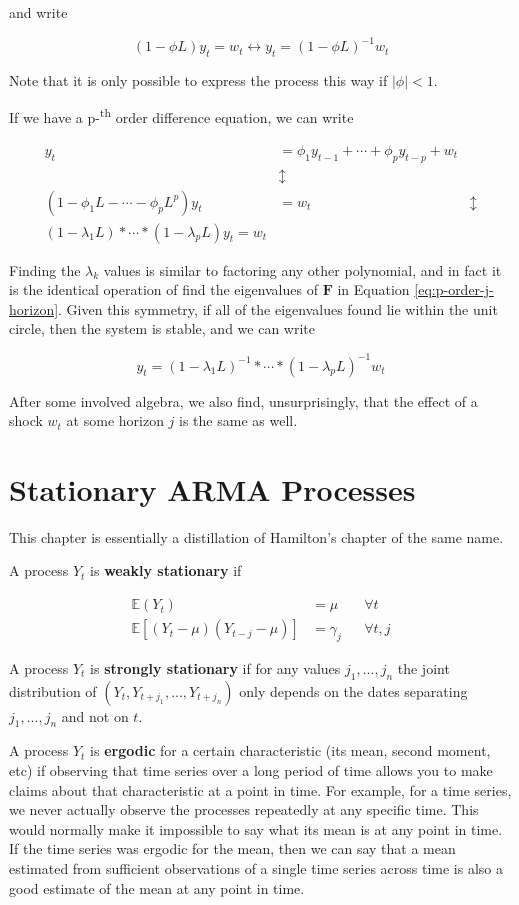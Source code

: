 \documentclass{tufte-book}
\begin{document}
\noindent and write 

\[
(1 - \phi L) y_t = w_t \leftrightarrow y_t = (1 - \phi L)^{-1} w_t
\]

Note that it is only possible to express the process this way if $|\phi|<1$.

If we have a p-\textsuperscript{th} order difference equation, we can write 

\begin{align*}
y_t &= \phi_1 y_{t-1} + \cdots + \phi_p y_{t-p} + w_t \\
&\updownarrow \\
(1 - \phi_1 L - \cdots - \phi_p L^p) y_t &= w_t
&\updownarrow \\
(1 - \lambda_1 L) * \cdots * (1 - \lambda_p L) y_t = w_t
\end{align*}

Finding the $\lambda_k$ values is similar to factoring any other polynomial, and in fact it is the identical operation of find the eigenvalues of $\bm{F}$ in Equation \ref{eq:p-order-j-horizon}. Given this symmetry, if all of the eigenvalues found lie within the unit circle, then the system is stable, and we can write 

\[
y_t = (1 - \lambda_1 L)^{-1} * \cdots * (1 - \lambda_p L)^{-1} w_t
\]

\noindent After some involved algebra, we also find, unsurprisingly, that the effect of a shock $w_t$ at some horizon $j$ is the same as well.

\chapter{Stationary ARMA Processes}

This chapter is essentially a distillation of Hamilton's \cite{hamilton1994time} chapter of the same name.

A process $Y_t$ is \textbf{weakly stationary} if 

\begin{align*}
\mathbb{E}(Y_t) &= \mu && \forall t \\
\mathbb{E}[(Y_t - \mu)(Y_{t-j} - \mu)] &= \gamma_j && \forall t, j
\end{align*}

A process $Y_t$ is \textbf{strongly stationary} if for any values $j_1, ..., j_n$ the joint distribution of $(Y_t, Y_{t+j_1}, ..., Y_{t+j_n})$ only depends on the dates separating $j_1, ..., j_n$ and not on $t$.

A process $Y_t$ is \textbf{ergodic} for a certain characteristic (its mean, second moment, etc) if observing that time series over a long period of time allows you to make claims about that characteristic at a point in time. For example, for a time series, we never actually observe the processes repeatedly at any specific time. This would normally make it impossible to say what its mean is at any point in time. If the time series was ergodic for the mean, then we can say that a mean estimated from sufficient observations of a single time series across time is also a good estimate of the mean at any point in time.
\end{document}
